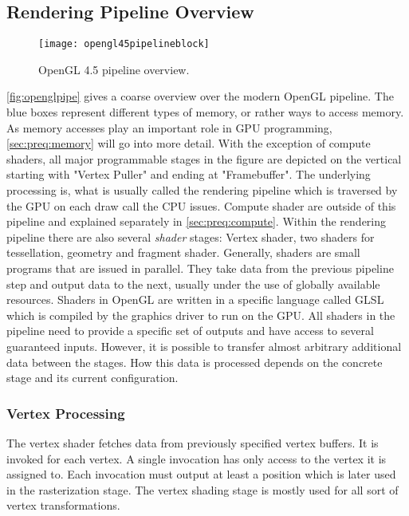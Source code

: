 \documentclass[thesis.tex]{subfiles}
\begin{document}
\subsection{Rendering Pipeline Overview}
\begin{figure}[h]
\centering
\texttt{[image: opengl45pipelineblock]}
\caption{\cite{bib:openglspec} OpenGL 4.5 pipeline overview.}
\label{fig:openglpipe}
\end{figure}
\autoref{fig:openglpipe} gives a coarse overview over the modern OpenGL pipeline.
The blue boxes represent different types of memory, or rather ways to access memory.
As memory accesses play an important role in GPU programming, \autoref{sec:preq:memory} will go into more detail.
With the exception of compute shaders, all major programmable stages in the figure are depicted on the vertical starting with "Vertex Puller" and ending at "Framebuffer".
The underlying processing is, what is usually called the rendering pipeline which is traversed by the GPU on each draw call the CPU issues.
Compute shader are outside of this pipeline and explained separately in \autoref{sec:preq:compute}.
Within the rendering pipeline there are also several \emph{shader} stages: Vertex shader, two shaders for tessellation, geometry and fragment shader.
Generally, shaders are small programs that are issued in parallel.
They take data from the previous pipeline step and output data to the next, usually under the use of globally available resources.
Shaders in OpenGL are written in a specific language called GLSL which is compiled by the graphics driver to run on the GPU.
All shaders in the pipeline need to provide a specific set of outputs and have access to several guaranteed inputs.
However, it is possible to transfer almost arbitrary additional data between the stages.
How this data is processed depends on the concrete stage and its current configuration.

\subsubsection{Vertex Processing}
The vertex shader fetches data from previously specified vertex buffers.
It is invoked for each vertex.
A single invocation has only access to the vertex it is assigned to.
Each invocation must output at least a position which is later used in the rasterization stage.
The vertex shading stage is mostly used for all sort of vertex transformations.
\end{document}
